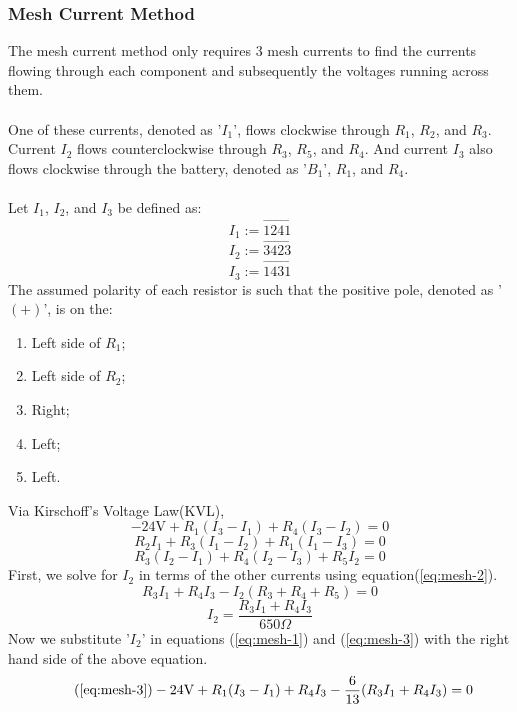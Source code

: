 \documentclass{article}
\begin{document}
	\subsubsection[Mesh]{Mesh Current Method}
	The mesh current method only requires 3 mesh currents to 
	find the 
	currents flowing through each component and subsequently the voltages 
	running across them. \\ \\
	One of these currents, denoted as '$I_1$', flows clockwise through $R_1$, 
	$R_2$, and $R_3$.  Current $I_2$ flows counterclockwise through $R_3$, 
	$R_5$, and 
	$R_4$.  And current $I_3$ also flows clockwise through the battery, denoted 
	as '$B_1$', $R_1$, and $R_4$. \\ \\
	Let $I_1$, $I_2$, and $I_3$ be defined as:
	$$ I_1:=\overrightarrow{1241}$$
	$$ I_2:=\overrightarrow{3423}$$
	$$ I_3:=\overrightarrow{1431}$$
	The assumed polarity of each resistor is such that the positive pole, 
	denoted as '$(+)$', is on the:
	\begin{enumerate}
		\item Left side of $R_1$;
		\item Left side of $R_2$;
		\item Right;
		\item Left;
		\item Left.
	\end{enumerate}
	Via Kirschoff's Voltage Law(KVL),
	\begin{equation}\label{eq:mesh-3}
		-24\text{V} + R_1(I_3-I_1) + R_4(I_3-I_2) = 0
	\end{equation}
	\begin{equation}\label{eq:mesh-1}
		R_2I_1 + R_3(I_1-I_2) + R_1(I_1-I_3) = 0
	\end{equation}
	\begin{equation}\label{eq:mesh-2}
		R_3(I_2-I_1) + R_4(I_2-I_3) + R_5I_2 = 0
	\end{equation}
	First, we solve for $I_2$ in terms of the other currents using 
	equation(\ref{eq:mesh-2}).
	$$ R_3I_1+R_4I_3-I_2(R_3 + R_4 + R_5) = 0$$
	\begin{equation}\label{eq:cur_2-in-cur_1-cur_3}
		I_2 = \frac{R_3I_1 + R_4I_3}{650\Omega}
	\end{equation}
	Now we substitute '$I_2$' in equations (\ref{eq:mesh-1}) and 
	(\ref{eq:mesh-3}) with the right hand side of the above equation.
	\begin{equation}\tag{\ref{eq:mesh-3}}
		-24\text{V} + R_1(I_3-I_1) + R_4I_3- \frac{6}{13}(R_3I_1 + R_4I_3) = 0
	\end{equation}
\end{document}

